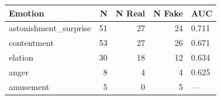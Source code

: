 \begin{tabular}{lrrrl}
\toprule
Emotion & N & N Real & N Fake & AUC \\
\midrule
astonishment\_surprise & 51 & 27 & 24 & 0.711 \\
contentment & 53 & 27 & 26 & 0.671 \\
elation & 30 & 18 & 12 & 0.634 \\
anger & 8 & 4 & 4 & 0.625 \\
amusement & 5 & 0 & 5 & — \\
\bottomrule
\end{tabular}
